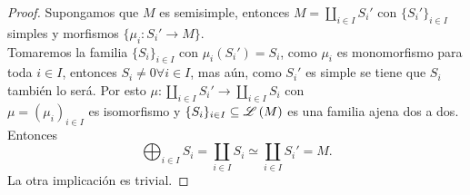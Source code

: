 \documentclass{article}
\begin{document}
\begin{enumerate}[label=\textbf{Ej \arabic*.}]
\begin{proof}
 Supongamos que $M$ es semisimple, entonces $M=\displaystyle\coprod_{i\in I}S_i'$ con $\{S_i'\}_{i\in I}$ simples y 
morfismos $\{\mu_i\colon S_i'\longrightarrow M\}$.\\
Tomaremos la familia $\{S_i\}_{i\in I}$ con $\mu_i(S_i')=S_i$, como $\mu_i$ es monomorfismo para toda $i\in I$, entonces
$S_i\neq 0$\quad $\forall i\in I$, mas aún, como $S_i'$ es simple se tiene que $S_i $ también lo será. Por esto
$\mu:\displaystyle\coprod_{i\in I}S_i'\longrightarrow \displaystyle\coprod_{i\in I}S_i$ con \\$\mu=(\mu_i)_{i\in I}$ es isomorfismo
 y $\{S_i\}_{i\in I}\subseteq\mathscr{L}\left(M\right)$ es una familia ajena dos a dos. Entonces 
\[\bigoplus_{i\in I}S_i=\coprod_{i\in I}S_i\simeq \coprod_{i\in I}S_i'=M.\]
La otra implicación es trivial.
\end{proof}
	\end{enumerate}
\end{document}
